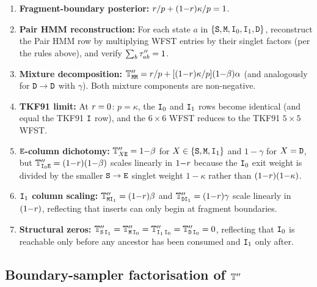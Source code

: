 \begin{enumerate}[nosep]
\item \textbf{Fragment-boundary posterior:}
  $r/p + (1{-}r)\kappa/p = 1$.

\item \textbf{Pair HMM reconstruction:}
  For each state $a$ in $\{{\tt S},{\tt M},{\tt I}_0,{\tt I}_1,{\tt D}\}$, reconstruct
  the Pair HMM row by multiplying WFST entries by their singlet factors
  (per the rules above), and verify $\sum_b \tau''_{ab} = 1$.

\item \textbf{Mixture decomposition:}
  $\mathbb{T}''_{{\tt M}{\tt M}} = r/p + [(1{-}r)\kappa/p](1{-}\beta)\alpha$
  (and analogously for ${\tt D} \to {\tt D}$ with $\gamma$).
  Both mixture components are non-negative.

\item \textbf{TKF91 limit:}
  At $r = 0$: $p = \kappa$, the ${\tt I}_0$ and ${\tt I}_1$ rows
  become identical (and equal the TKF91 ${\tt I}$ row), and the
  $6{\times}6$ WFST reduces to the TKF91 $5{\times}5$ WFST.

\item \textbf{${\tt E}$-column dichotomy:}
  $\mathbb{T}''_{X{\tt E}} = 1{-}\beta$ for $X \in \{{\tt S},{\tt M},{\tt I}_1\}$
  and $1{-}\gamma$ for $X = {\tt D}$, but
  $\mathbb{T}''_{{\tt I}_0{\tt E}} = (1{-}r)(1{-}\beta)$ scales linearly
  in $1{-}r$ because the ${\tt I}_0$ exit weight is divided by the
  smaller ${\tt S}\to{\tt E}$ singlet weight $1{-}\kappa$ rather than
  $(1{-}r)(1{-}\kappa)$.

\item \textbf{${\tt I}_1$ column scaling:}
  $\mathbb{T}''_{{\tt M}{\tt I}_1} = (1{-}r)\beta$ and
  $\mathbb{T}''_{{\tt D}{\tt I}_1} = (1{-}r)\gamma$ scale linearly in
  $(1{-}r)$, reflecting that inserts can only begin at fragment
  boundaries.

\item \textbf{Structural zeros:}
  $\mathbb{T}''_{{\tt S}\,{\tt I}_1} = \mathbb{T}''_{{\tt M}\,{\tt I}_0}
  = \mathbb{T}''_{{\tt I}_1\,{\tt I}_0} = \mathbb{T}''_{{\tt D}\,{\tt I}_0} = 0$,
  reflecting that ${\tt I}_0$ is reachable only before any ancestor
  has been consumed and ${\tt I}_1$ only after.
\end{enumerate}

\subsection{Boundary-sampler factorisation of $\mathbb{T}''$}
\label{sec:wfst92-boundary-factor}

